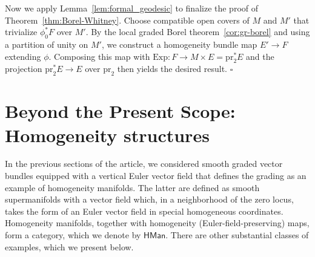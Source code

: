 \documentclass[a4paper,12pt]{amsart}
\newcommand{\cN}{{\mathcal N}}
\newcommand{\p}{\mathrm{pr}}
\newcommand{\wE}{\widehat{E}}
\newcommand{\Exp}{\mathrm{Exp}}
\begin{document}
\medskip
\noindent Now we apply Lemma~\ref{lem:formal_geodesic} to finalize  the proof of Theorem~\ref{thm:Borel-Whitney}.
Choose compatible open covers of $M$ and $M'$ that trivialize $\phi_0^*F$ over $M'$. By the local graded Borel theorem~\ref{cor:gr-borel} and using a partition of unity on $M'$, we construct a homogeneity bundle map $E'\to F$ extending $\phi$. Composing this map with $\Exp\colon F\to M\times E=\p_2^*E$ and the projection $\p_2^*E\to E$ over $\p_2$ then yields the desired result.
    $\square$

\section{Beyond the Present Scope: Homogeneity structures}\label{sec:beyond}

\noindent In the previous sections of the article, we considered smooth graded vector bundles equipped with a vertical Euler vector field that defines the grading as an example of homogeneity manifolds. The latter are defined as smooth supermanifolds with a vector field which, in a neighborhood of the zero locus, takes the form of an Euler vector field in special homogeneous coordinates. Homogeneity manifolds, together with homogeneity (Euler-field-preserving) maps, form a category, which we denote by $\mathsf{HMan}$.
 There are other substantial classes of examples, which we present below.
\end{document}
